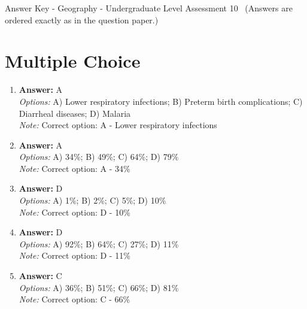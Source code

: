 \documentclass[12pt]{article}
\begin{document}
\begin{center}
Answer Key - Geography - Undergraduate Level Assessment 10 \
\small (Answers are ordered exactly as in the question paper.)
\end{center}

\section*{Multiple Choice}
\begin{enumerate}[label=\arabic*.]
\item \textbf{Answer:} A
\\ \textit{Options:} A) Lower respiratory infections; B) Preterm birth complications; C) Diarrheal diseases; D) Malaria
\\ \textit{Note:} Correct option: A - Lower respiratory infections
\item \textbf{Answer:} A
\\ \textit{Options:} A) 34\%; B) 49\%; C) 64\%; D) 79\%
\\ \textit{Note:} Correct option: A - 34\%
\item \textbf{Answer:} D
\\ \textit{Options:} A) 1\%; B) 2\%; C) 5\%; D) 10\%
\\ \textit{Note:} Correct option: D - 10\%
\item \textbf{Answer:} D
\\ \textit{Options:} A) 92\%; B) 64\%; C) 27\%; D) 11\%
\\ \textit{Note:} Correct option: D - 11\%
\item \textbf{Answer:} C
\\ \textit{Options:} A) 36\%; B) 51\%; C) 66\%; D) 81\%
\\ \textit{Note:} Correct option: C - 66\%
\end{enumerate}
\end{document}
